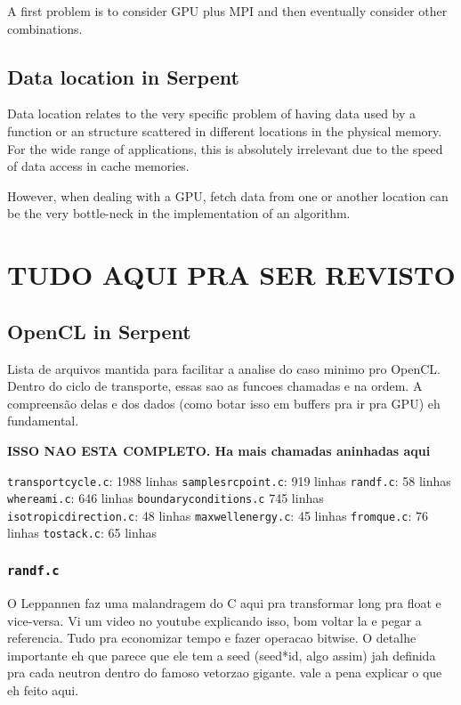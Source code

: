 \documentclass[twoside,a4paper,12pt,english]{anstrans}
\begin{document}
A first problem is to consider GPU plus MPI and then eventually consider other combinations.

\subsection{Data location in Serpent}

Data location relates to the very specific problem of having data used by a function or an
structure scattered in different locations in the physical memory. For the wide range of
applications, this is absolutely irrelevant due to the speed of data access in cache memories.

However, when dealing with a GPU, fetch data from one or another location can be the very
bottle-neck in the implementation of an algorithm.

\section{TUDO AQUI PRA SER REVISTO}

\subsection{OpenCL in Serpent}

Lista de arquivos mantida para facilitar a analise do caso minimo pro OpenCL.
Dentro do ciclo de transporte, essas sao as funcoes chamadas e na ordem. A compreensão
delas e dos dados (como botar isso em buffers pra ir pra GPU) eh fundamental.

\textbf{ISSO NAO ESTA COMPLETO. Ha mais chamadas aninhadas aqui}
\begin{outline}[enumerate]
  \1 \texttt{transportcycle.c}: 1988 linhas
  \2 \texttt{samplesrcpoint.c}: 919 linhas
  \3 \texttt{randf.c}: 58 linhas
  \3 \texttt{whereami.c}: 646 linhas
  \3 \texttt{boundaryconditions.c} 745 linhas
  \3 \texttt{isotropicdirection.c}: 48 linhas
  \3 \texttt{maxwellenergy.c}: 45 linhas
  \2 \texttt{fromque.c}: 76 linhas
  \2 \texttt{tostack.c}: 65 linhas
\end{outline}

\subsubsection{\texttt{randf.c}}

O Leppannen faz uma malandragem do C aqui pra transformar long pra float e vice-versa.
Vi um video no youtube explicando isso, bom voltar la e pegar a referencia. Tudo pra
economizar tempo e fazer operacao bitwise. O detalhe importante eh que parece que
ele tem a seed (seed*id, algo assim) jah definida pra cada neutron dentro do famoso
vetorzao gigante. vale a pena explicar o que eh feito aqui.
\end{document}
